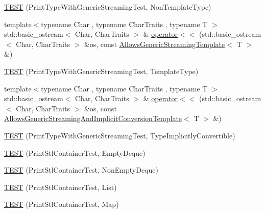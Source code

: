 \begin{DoxyCompactItemize}
\item 
\hyperlink{namespacetesting_1_1gtest__printers__test_a9272037c799c4779e1d79476dad66cb6}{\-T\-E\-S\-T} (\-Print\-Type\-With\-Generic\-Streaming\-Test, \-Non\-Template\-Type)
\item 
{\footnotesize template$<$typename Char , typename Char\-Traits , typename T $>$ }\\std\-::basic\-\_\-ostream$<$ \-Char, \*
\-Char\-Traits $>$ \& \hyperlink{namespacetesting_1_1gtest__printers__test_a5464168e925b1adf29986c8e544e908e}{operator$<$$<$} (std\-::basic\-\_\-ostream$<$ \-Char, \-Char\-Traits $>$ \&os, const \hyperlink{classtesting_1_1gtest__printers__test_1_1AllowsGenericStreamingTemplate}{\-Allows\-Generic\-Streaming\-Template}$<$ \-T $>$ \&)
\item 
\hyperlink{namespacetesting_1_1gtest__printers__test_a6e180c85f307712a995985f7bc735fd1}{\-T\-E\-S\-T} (\-Print\-Type\-With\-Generic\-Streaming\-Test, \-Template\-Type)
\item 
{\footnotesize template$<$typename Char , typename Char\-Traits , typename T $>$ }\\std\-::basic\-\_\-ostream$<$ \-Char, \*
\-Char\-Traits $>$ \& \hyperlink{namespacetesting_1_1gtest__printers__test_a09eedfbca613302efe6438d2a537f419}{operator$<$$<$} (std\-::basic\-\_\-ostream$<$ \-Char, \-Char\-Traits $>$ \&os, const \hyperlink{classtesting_1_1gtest__printers__test_1_1AllowsGenericStreamingAndImplicitConversionTemplate}{\-Allows\-Generic\-Streaming\-And\-Implicit\-Conversion\-Template}$<$ \-T $>$ \&)
\item 
\hyperlink{namespacetesting_1_1gtest__printers__test_a68877c5e1ec7a53281798310c30e1776}{\-T\-E\-S\-T} (\-Print\-Type\-With\-Generic\-Streaming\-Test, \-Type\-Implicitly\-Convertible)
\item 
\hyperlink{namespacetesting_1_1gtest__printers__test_a1ce10b8a3634e0f6bfbfbb5888c04a95}{\-T\-E\-S\-T} (\-Print\-Stl\-Container\-Test, \-Empty\-Deque)
\item 
\hyperlink{namespacetesting_1_1gtest__printers__test_a249d482cf4a1525bd043489dcbd3e200}{\-T\-E\-S\-T} (\-Print\-Stl\-Container\-Test, \-Non\-Empty\-Deque)
\item 
\hyperlink{namespacetesting_1_1gtest__printers__test_aaa135672ff79ecaef82c6046f2ab8d29}{\-T\-E\-S\-T} (\-Print\-Stl\-Container\-Test, \-List)
\item 
\hyperlink{namespacetesting_1_1gtest__printers__test_a3d701a1866f260a42411e9041894c49c}{\-T\-E\-S\-T} (\-Print\-Stl\-Container\-Test, \-Map)
\item 

\end{DoxyCompactItemize}

